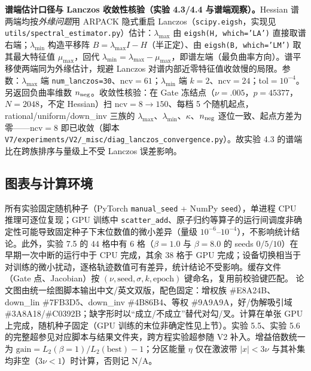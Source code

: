 \documentclass[fontset=windows,11pt]{ctexart}
\numberwithin{equation}{section}
\begin{document}
\par\smallskip\noindent\textbf{谱端估计口径与 Lanczos 收敛性核验（实验 4.3/4.4 与谱端观察）。}Hessian 谱两端均按\emph{外缘问题}用 ARPACK 隐式重启 Lanczos（\texttt{scipy.eigsh}，实现见 \texttt{utils/\hspace{0pt}spectral\_\hspace{0pt}estimator.py}）估计：$\lambda_{\max}$ 由 \texttt{eigsh(H, which='LA')} 直接取谱右端；$\lambda_{\min}$ 构造平移阵 $B=\lambda_{\max}I-H$（半正定）、由 \texttt{eigsh(B, which='LM')} 取其最大特征值 $\mu_{\max}$，回代 $\lambda_{\min}=\lambda_{\max}-\mu_{\max}$，即谱左端（最负曲率方向）。谱平移使两端同为外缘估计，规避 Lanczos 对谱内部近零特征值收敛慢的局限。参数：$\lambda_{\max}$ 端 \texttt{num\_\hspace{0pt}lanczos=30}、ncv$=61$；$\lambda_{\min}$ 端 $k=2$、ncv$=24$；tol$=10^{-4}$。另返回负曲率维数 $n_{\rm neg}$。收敛性核验：在 Gate 冻结点（$\nu=.005$，$p=45377$，$N=2048$，不定 Hessian）扫 ncv$=8\to150$、每档 5 个随机起点，rational/uniform/down\_inv 三族的 $\lambda_{\max}$、$\lambda_{\min}$、$\kappa$、$n_{\rm neg}$ 逐位一致、起点方差为零——ncv$=8$ 即已收敛（脚本 \texttt{V7/\hspace{0pt}experiments/\hspace{0pt}V2/\hspace{0pt}\_\hspace{0pt}misc/\hspace{0pt}diag\_\hspace{0pt}lanczos\_\hspace{0pt}convergence.py}）。故实验 4.3 的谱端比在跨族排序与量级上不受 Lanczos 误差影响。
\subsection{图表与计算环境}
所有实验固定随机种子（PyTorch \texttt{manual\_\hspace{0pt}seed} + NumPy \texttt{seed}），单进程 CPU 推理可逐位复现；GPU 训练中 \texttt{scatter\_\hspace{0pt}add}、原子归约等算子的运行间调度非确定性可能导致固定种子下末位数值的微小差异（量级 $10^{-6}$--$10^{-4}$），不影响统计结论。此外，实验 7.5 的 $44$ 格中有 $6$ 格（$\beta=1.0$ 与 $\beta=8.0$ 的 seeds $0/5/10$）在早期一次中断的运行中于 CPU 完成，其余 $38$ 格于 GPU 完成；设备切换相当于对训练的微小扰动，逐格轨迹数值可有差异，统计结论不受影响。缓存文件（Gate 点、Jacobian）按 $(\nu,\text{seed},\sigma,k,\text{epoch})$ 键命名，复用前校验键匹配。
论文图由统一绘图脚本输出中文/英文双版，配色固定：增权族 \#E8A24B、down\_lin \#7FB3D5、down\_inv \#4B86B4、等权 \#9A9A9A，好/伪解吸引域 \#3A8A18/\#C0392B；缺字形时以“成立/不成立”替代对勾/叉。计算在单张 GPU 上完成，随机种子固定（GPU 训练的末位非确定性见上节）。实验 5.5、实验 5.6 的完整超参见对应脚本与结果文件夹，跨方程实验超参随 V2 补入。增益倍数统一为 $\mathrm{gain}=L_2(\beta=1)/L_2(\mathrm{best})-1$；分区能量 $\eta$ 仅在激波带 $|x|<3\nu$ 与其补集均非空（$3\nu<1$）时计算，否则记 N/A。
\end{document}
